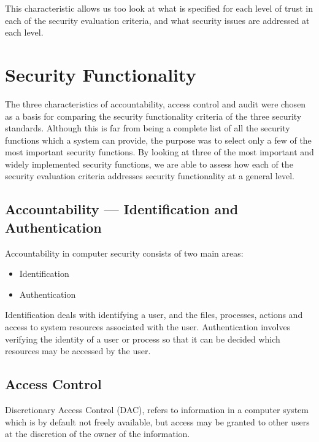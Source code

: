             This characteristic allows us too look at what is specified for each level
            of trust in each of the security evaluation criteria, and what security issues
            are addressed at each level.

    \section{Security Functionality}
        The three characteristics of accountability, access control and audit were chosen
        as a basis for comparing the security functionality criteria of the three
        security standards. Although this is far from being a complete list of all the 
        security functions which a system can provide, the purpose was to select 
        only a few of the most important security functions. By looking at three of
        the most important and widely implemented security functions, we are able
        to assess how each of the security evaluation criteria addresses security functionality
        at a general level.

        \subsection{Accountability --- Identification and Authentication}
            Accountability in computer security consists of two main
            areas:
                \begin{itemize}
                    \item Identification 
                    \item Authentication
                \end{itemize}
            Identification deals with identifying a user, and the files,
            processes, actions and access to system resources 
            associated with the user.
            Authentication involves verifying the identity of a user or
            process so that it can be decided which resources may be
            accessed by the user.

        \subsection{Access Control}
            Discretionary Access Control (DAC), refers to information
            in a computer system which is by default not freely
            available, but access may be granted to other users at the
            discretion of the owner of the information.

